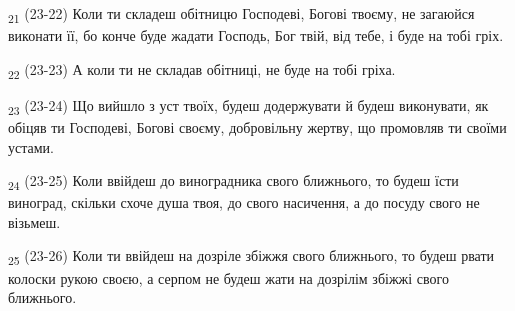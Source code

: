 \begin{tcolorbox}
\textsubscript{21} (23-22) Коли ти складеш обітницю Господеві, Богові твоєму, не загаюйся виконати її, бо конче буде жадати Господь, Бог твій, від тебе, і буде на тобі гріх.
\end{tcolorbox}
\begin{tcolorbox}
\textsubscript{22} (23-23) А коли ти не складав обітниці, не буде на тобі гріха.
\end{tcolorbox}
\begin{tcolorbox}
\textsubscript{23} (23-24) Що вийшло з уст твоїх, будеш додержувати й будеш виконувати, як обіцяв ти Господеві, Богові своєму, добровільну жертву, що промовляв ти своїми устами.
\end{tcolorbox}
\begin{tcolorbox}
\textsubscript{24} (23-25) Коли ввійдеш до виноградника свого ближнього, то будеш їсти виноград, скільки схоче душа твоя, до свого насичення, а до посуду свого не візьмеш.
\end{tcolorbox}
\begin{tcolorbox}
\textsubscript{25} (23-26) Коли ти ввійдеш на дозріле збіжжя свого ближнього, то будеш рвати колоски рукою своєю, а серпом не будеш жати на дозрілім збіжжі свого ближнього.
\end{tcolorbox}
